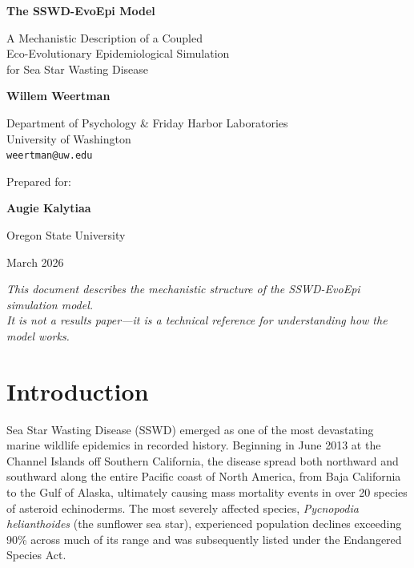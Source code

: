 \documentclass[11pt,letterpaper]{article}
\begin{document}
\begin{titlepage}
\centering
\vspace*{2cm}
{\Huge\bfseries The SSWD-EvoEpi Model\par}
\vspace{0.5cm}
{\Large A Mechanistic Description of a Coupled\\Eco-Evolutionary Epidemiological Simulation\\for Sea Star Wasting Disease\par}
\vspace{2cm}
{\large\textbf{Willem Weertman}\par}
{\normalsize Department of Psychology \& Friday Harbor Laboratories\\
University of Washington\\
\texttt{weertman@uw.edu}\par}
\vspace{1.5cm}
{\normalsize Prepared for:\par}
\vspace{0.3cm}
{\large\textbf{Augie Kalytiaa}\par}
{\normalsize Oregon State University\par}
\vspace{2cm}
{\normalsize March 2026\par}
\vspace{\fill}
{\small\textit{This document describes the mechanistic structure of the SSWD-EvoEpi simulation model.\\It is not a results paper---it is a technical reference for understanding how the model works.}\par}
\end{titlepage}

\tableofcontents
\newpage

\section{Introduction}
\label{sec:intro}

Sea Star Wasting Disease (SSWD) emerged as one of the most devastating marine wildlife epidemics in recorded history. Beginning in June 2013 at the Channel Islands off Southern California, the disease spread both northward and southward along the entire Pacific coast of North America, from Baja California to the Gulf of Alaska, ultimately causing mass mortality events in over 20 species of asteroid echinoderms. The most severely affected species, \textit{Pycnopodia helianthoides} (the sunflower sea star), experienced population declines exceeding 90\% across much of its range and was subsequently listed under the Endangered Species Act.
\end{document}
